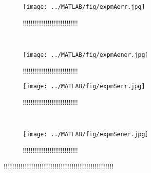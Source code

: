 \begin{figure}[H]
        \centering
        \begin{subfigure}[b]{0.30\textwidth}
                \texttt{[image: ../MATLAB/fig/expmAerr.jpg]}
                \caption{ !!!!!!!!!!!!!!!!!!!!!!!!!!!!! }
                \label{fig:expmAerr}
        \end{subfigure}%
        ~
        \begin{subfigure}[b]{0.30\textwidth}
                \texttt{[image: ../MATLAB/fig/expmAener.jpg]}
                \caption{ !!!!!!!!!!!!!!!!!!!!!!!!!!!!! }
                \label{fig:expmAener}
        \end{subfigure}
		
		\begin{subfigure}[b]{0.30\textwidth}
                \texttt{[image: ../MATLAB/fig/expmSerr.jpg]}
                \caption{ !!!!!!!!!!!!!!!!!!!!!!!!!!!!! }
                \label{fig:expmSerr}
        \end{subfigure}%
        ~
        \begin{subfigure}[b]{0.30\textwidth}
                \texttt{[image: ../MATLAB/fig/expmSener.jpg]}
                \caption{ !!!!!!!!!!!!!!!!!!!!!!!!!!!!! }
                \label{fig:expmSener}
        \end{subfigure}
        \caption{!!!!!!!!!!!!!!!!!!!!!!!!!!!!!!!!!!!!!!!!!!!!!!!!!!!!!!!!!!}
        \label{fig:}
\end{figure}